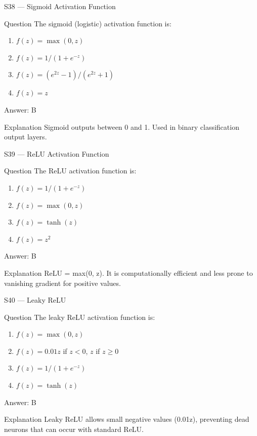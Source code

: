 \documentclass[aspectratio=169,8pt]{beamer}
\begin{document}
	\begin{frame}{S38 --- Sigmoid Activation Function}
		\begin{block}{Question}
			The sigmoid (logistic) activation function is:
			\begin{enumerate}
				\item $f(z) = \max(0, z)$
				\item $f(z) = 1/(1 + e^{-z})$
				\item $f(z) = (e^{2z} - 1)/(e^{2z} + 1)$
				\item $f(z) = z$
			\end{enumerate}
		\end{block}
		\begin{exampleblock}{Answer: B}\end{exampleblock}
		\begin{block}{Explanation}
			Sigmoid outputs between 0 and 1. Used in binary classification output layers.
		\end{block}
	\end{frame}
	
	\begin{frame}{S39 --- ReLU Activation Function}
		\begin{block}{Question}
			The ReLU activation function is:
			\begin{enumerate}
				\item $f(z) = 1/(1 + e^{-z})$
				\item $f(z) = \max(0, z)$
				\item $f(z) = \tanh(z)$
				\item $f(z) = z^2$
			\end{enumerate}
		\end{block}
		\begin{exampleblock}{Answer: B}\end{exampleblock}
		\begin{block}{Explanation}
			ReLU = max(0, z). It is computationally efficient and less prone to vanishing gradient for positive values.
		\end{block}
	\end{frame}
	
	\begin{frame}{S40 --- Leaky ReLU}
		\begin{block}{Question}
			The leaky ReLU activation function is:
			\begin{enumerate}
				\item $f(z) = \max(0, z)$
				\item $f(z) = 0.01z$ if $z < 0$, $z$ if $z \geq 0$
				\item $f(z) = 1/(1+e^{-z})$
				\item $f(z) = \tanh(z)$
			\end{enumerate}
		\end{block}
		\begin{exampleblock}{Answer: B}\end{exampleblock}
		\begin{block}{Explanation}
			Leaky ReLU allows small negative values (0.01z), preventing dead neurons that can occur with standard ReLU.
		\end{block}
	\end{frame}
	
\end{document}
